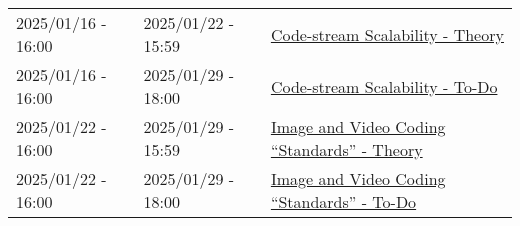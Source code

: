 \begin{tabular}{|l|l|l|}
  2025/01/16 - 16:00 & 2025/01/22 - 15:59 & \href{https://sistemas-multimedia.github.io/contents/data_scalability/}{Code-stream Scalability - Theory} \\ %
  2025/01/16 - 16:00 & 2025/01/29 - 18:00 & \href{https://sistemas-multimedia.github.io/contents/data_scalability/#x1-150008}{Code-stream Scalability - To-Do} \\
  2025/01/22 - 16:00 & 2025/01/29 - 15:59 & \href{https://sistemas-multimedia.github.io/contents/standards/}{Image and Video Coding ``Standards'' - Theory} \\ %
  2025/01/22 - 16:00 & 2025/01/29 - 18:00 & \href{https://sistemas-multimedia.github.io/contents/standards/#x1-40003/}{Image and Video Coding ``Standards'' - To-Do} \\
  \hline
\end{tabular}

